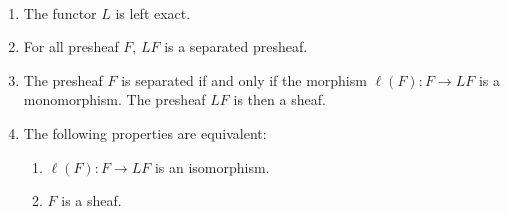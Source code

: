 \documentclass[12pt]{article}
\theoremstyle{remark}
\theoremstyle{definition}
\begin{document}
\begin{prop}[Proposition 3.2]\
\begin{enumerate}%
\item The functor $L$ is left exact.

\item For all presheaf $F$, $LF$ is a separated presheaf.

\item The presheaf $F$ is separated if and only if the morphism $\ell(F):F\to LF$ is a monomorphism. The presheaf $LF$ is then a sheaf.

\item The following properties are equivalent:
\begin{enumerate}
\item $\ell(F):F\to LF$ is an isomorphism.
\item $F$ is a sheaf.
\end{enumerate}
\end{enumerate}
\end{prop}
\end{document}
